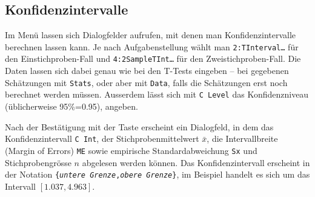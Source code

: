 \documentclass[a4paper,11pt,notitlepage,halfparskip,headsepline,normalheadings,twoside]{scrartcl}
\newlength{\tikey}
\newcommand{\keystroke}[1]{\settowidth{\tikey}{\scriptsize #1}\psframebox[framearc=0.2]{\parbox{\tikey}{\scriptsize\textsf{#1}}}}
\begin{document}
\subsection{Konfidenzintervalle}
\begin{window}
Im Menü \keystroke{F7} lassen sich Dialogfelder aufrufen, mit denen man
Konfidenzintervalle berechnen lassen kann. Je nach Aufgabenstellung wählt man
\texttt{2:TInterval\ldots} für den Einstichproben-Fall und
\texttt{4:2SampleTInt\ldots} für den Zweistichproben-Fall. Die Daten lassen sich
dabei genau wie bei den T-Tests eingeben -- bei gegebenen Schätzungen mit
\texttt{Stats}, oder aber mit \texttt{Data}, falls die Schätzungen erst noch
berechnet werden müssen. Ausserdem lässt sich mit \texttt{C Level} das
Konfidenzniveau (üblicherweise 95\%=0.95), angeben.
\end{window}

\begin{window}
Nach der Bestätigung mit der Taste \keystroke{ENTER} erscheint ein Dialogfeld,
in dem das Konfidenzintervall \texttt{C Int}, der Stichprobenmittelwert
$\bar{x}$, die Intervallbreite (Margin of Errors) \texttt{ME} sowie empirische
Standardabweichung \texttt{Sx} und Stichprobengrösse $n$ abgelesen werden
können. Das Konfidenzintervall erscheint in der Notation
\texttt{\{\textit{untere Grenze},\textit{obere Grenze}\}}, im Beispiel handelt
es sich um das Intervall $[1.037, 4.963]$.
\end{window}
\end{document}
